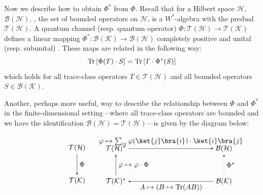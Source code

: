 Now we describe how to obtain  $\Phi^*$ from $\Phi$. 
Recall that for a Hilbert space \( \mathcal{H} \), \( \mathcal{B}(\mathcal{H}) \), \ie, the set of bounded operators on \( \mathcal{H} \), is a \( W^* \)-algebra with the predual \( \mathcal{T}(\mathcal{H}) \).
A quantum channel (resp. quantum operator) $\Phi: \mathcal{T}(\mathcal{H})  \to \mathcal{T}(\mathcal{K})$ defines a linear mapping 
$\Phi^*: \mathcal{B}(\mathcal{K}) \to \mathcal{B}(\mathcal{H})$ completely positive and unital (resp. subunital) \cite[Proposition 5.1,]{choSemanticsQuantumProgramming2016}. These maps are related in the following way:
\begin{equation*}
\text{Tr}\left[\Phi(T) \cdot S\right] = \text{Tr} \left[T \cdot \Phi^*(S)\right]
\end{equation*}
which holds for all trace-class operators $T \in \mathcal{T}(\mathcal{H})$ and all bounded operators $S \in \mathcal{B}(\mathcal{K})$.

Another, perhaps more useful, way to describe the relationship between $\Phi$ and $\Phi^*$ in the finite-dimensional setting---where all trace-class operators are bounded and we have the identification \( \mathcal{B}(\mathcal{H}) = \mathcal{T}(\mathcal{H}) \)---is given by the diagram below:

\[
\hspace{-50pt}
\begin{minipage}{0.45\textwidth}
\centering
\begin{tikzpicture}
  \matrix (m) [matrix of math nodes,row sep=3em,column sep=2em,minimum width=1em]
  { 
    \mathcal{T}(\mathcal{H}) \\
     \mathcal{T}(\mathcal{K})  \\
  };
  \path[-stealth]
    (m-1-1) edge  node [right] {$\Phi$} (m-2-1);
\end{tikzpicture}
\end{minipage}
\hspace{-50pt}
\begin{minipage}{0.45\textwidth}
\centering
\begin{tikzpicture}
  \matrix (m) [matrix of math nodes,row sep=3em,column sep=12em,minimum width=1em]
  {
  \mathcal{T}(\mathcal{H})^*&  \mathcal{B}(\mathcal{H})  \\
   \mathcal{T}(\mathcal{K})^* &  \mathcal{B}(\mathcal{K}) \\
  };
  \path[-stealth]
    (m-1-1) edge  node [above] {$\varphi \mapsto \sum_{ij} \varphi(\ket{j}\bra{i}) \cdot \ket{i} \bra{j}  $} (m-1-2)
    (m-2-2) edge [dotted]  node [right] {$\Phi^*$} (m-1-2)
    (m-2-2) edge  node [below] {$ A \mapsto (B \mapsto \tr(AB)) $} (m-2-1)
    (m-2-1) edge  node [right] {$ \varphi \mapsto \varphi \cdot \Phi $} (m-1-1)
    ;
\end{tikzpicture}
\end{minipage}
\]

